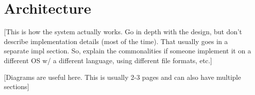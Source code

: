 \section{Architecture}
\label{SEC:architecture}

[This is how the system actually works.  Go in depth with the design, but 
don't describe implementation details (most of the time).  That usually
goes in a separate impl section.  So, explain the commonalities if someone 
implement it on a different OS w/ a different language, using different
file formats, etc.]

[Diagrams are useful here.  This is usually 2-3 pages and can also have 
multiple sections]



